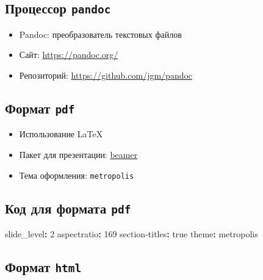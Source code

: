 \documentclass[
  letterpaper,
  DIV=11,
  numbers=noendperiod]{scrartcl}
\newenvironment{Shaded}{\begin{snugshade}}{\end{snugshade}}
\newcommand{\AttributeTok}[1]{\textcolor[rgb]{0.40,0.45,0.13}{#1}}
\newcommand{\CharTok}[1]{\textcolor[rgb]{0.13,0.47,0.30}{#1}}
\newcommand{\DecValTok}[1]{\textcolor[rgb]{0.68,0.00,0.00}{#1}}
\newcommand{\FunctionTok}[1]{\textcolor[rgb]{0.28,0.35,0.67}{#1}}
\newcommand{\KeywordTok}[1]{\textcolor[rgb]{0.00,0.23,0.31}{\textbf{#1}}}
\providecommand{\tightlist}{%
  \setlength{\itemsep}{0pt}\setlength{\parskip}{0pt}}\usepackage{longtable,booktabs,array}
\begin{document}
\subsection{\texorpdfstring{Процессор
\texttt{pandoc}}{Процессор pandoc}}\label{ux43fux440ux43eux446ux435ux441ux441ux43eux440-pandoc}

\begin{itemize}
\tightlist
\item
  Pandoc: преобразователь текстовых файлов
\item
  Сайт: \url{https://pandoc.org/}
\item
  Репозиторий: \url{https://github.com/jgm/pandoc}
\end{itemize}

\subsection{\texorpdfstring{Формат
\texttt{pdf}}{Формат pdf}}\label{ux444ux43eux440ux43cux430ux442-pdf}

\begin{itemize}
\tightlist
\item
  Использование LaTeX
\item
  Пакет для презентации: \href{https://ctan.org/pkg/beamer}{beamer}
\item
  Тема оформления: \texttt{metropolis}
\end{itemize}

\subsection{\texorpdfstring{Код для формата
\texttt{pdf}}{Код для формата pdf}}\label{ux43aux43eux434-ux434ux43bux44f-ux444ux43eux440ux43cux430ux442ux430-pdf}

\begin{Shaded}
\begin{Highlighting}[]
\FunctionTok{slide\_level}\KeywordTok{:}\AttributeTok{ }\DecValTok{2}
\FunctionTok{aspectratio}\KeywordTok{:}\AttributeTok{ }\DecValTok{169}
\FunctionTok{section{-}titles}\KeywordTok{:}\AttributeTok{ }\CharTok{true}
\FunctionTok{theme}\KeywordTok{:}\AttributeTok{ metropolis}
\end{Highlighting}
\end{Shaded}

\subsection{\texorpdfstring{Формат
\texttt{html}}{Формат html}}\label{ux444ux43eux440ux43cux430ux442-html}
\end{document}
